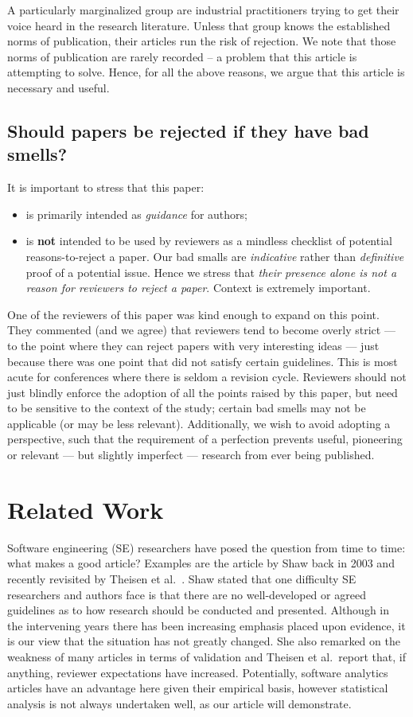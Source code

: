 \documentclass[preprint,10pt]{elsarticle}
\newcommand{\bi}{\begin{itemize}}
\newcommand{\ei}{\end{itemize}}
\newcommand{\RED}{\color{red}}
\newcommand{\BLACK}{\color{black}}
\begin{document}
A particularly marginalized group are industrial practitioners trying to get their voice heard in the research literature.  Unless that group knows the established norms of publication, their articles run the risk of rejection. We note that those norms of publication are rarely recorded -- a problem that this article is attempting to solve.  Hence, for all the above reasons, we argue that this article is necessary and useful.

\RED \subsection{Should papers be rejected if they have bad smells?}\label{sec:reject}

It is important to stress that this paper:
\bi
\item
is primarily intended as \textit{guidance} for authors;
\item
is {\bf not} intended to be used by reviewers as a mindless checklist of potential reasons-to-reject a paper.  
Our bad smalls are {\em indicative} rather than {\em definitive} proof of a potential issue.  Hence we stress that {\em their presence alone is not a reason for reviewers to reject a paper}.   Context is extremely important.
\ei
One of the reviewers of this paper was kind enough to expand on this point. They commented (and we agree) that reviewers tend to become overly strict --- to the point where they can reject papers with very interesting ideas --- just because there was one point that did not satisfy certain guidelines.  This is most acute for conferences where there is seldom a revision cycle. Reviewers should not just blindly enforce the adoption of all the points raised by this paper, but need to be sensitive to the context of the study; certain bad smells may not be applicable (or may be less relevant).   Additionally, we wish to avoid adopting a perspective, such that the requirement of a perfection prevents useful, pioneering or relevant --- but slightly imperfect --- research from ever being published.
\BLACK
 

\section{Related Work}\label{Sec:RelWk}
 
Software engineering (SE) researchers have posed the question from time to time: what makes a good article?  Examples are the article by Shaw \cite{Shaw03} back in 2003 and recently revisited by Theisen et al.~\cite{Thei17}.  Shaw stated that one difficulty SE researchers and authors face is that there are no well-developed or agreed guidelines as to how research should be conducted and presented.  Although in the intervening years there has been increasing emphasis placed upon evidence, it is our view that the situation has not greatly changed.  She also remarked on the weakness of many articles in terms of  validation and Theisen et al.\ report that, if anything, reviewer expectations have increased.  Potentially, software analytics articles have an advantage here given their empirical basis, however statistical analysis is not always undertaken well, as our article will demonstrate.
\end{document}
